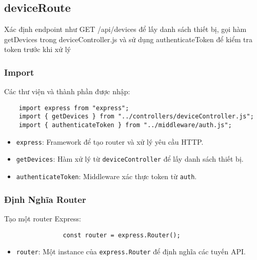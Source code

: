         \subsection{deviceRoute}
            \hspace*{0.6cm}Xác định endpoint như GET /api/devices để lấy danh sách thiết bị, gọi hàm getDevices trong deviceController.js và sử dụng authenticateToken để kiểm tra token trước khi xử lý
            \subsubsection{Import}
                \hspace*{0.6cm}Các thư viện và thành phần được nhập:
                \begin{lstlisting}
    import express from "express";
    import { getDevices } from "../controllers/deviceController.js";
    import { authenticateToken } from "../middleware/auth.js";
                \end{lstlisting}
                \begin{itemize}
                    \item \texttt{express}: Framework để tạo router và xử lý yêu cầu HTTP.
                    \item \texttt{getDevices}: Hàm xử lý từ \texttt{deviceController} để lấy danh sách thiết bị.
                    \item \texttt{authenticateToken}: Middleware xác thực token từ \texttt{auth}.
                \end{itemize}

            \subsubsection{Định Nghĩa Router}
                \hspace*{0.6cm}Tạo một router Express:
                \begin{lstlisting}
                const router = express.Router();
                \end{lstlisting}
                \begin{itemize}
                    \item \texttt{router}: Một instance của \texttt{express.Router} để định nghĩa các tuyến API.
                \end{itemize}

